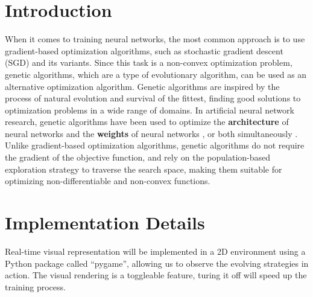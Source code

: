 \documentclass[sigconf]{acmart}
\begin{document}
\section{Introduction}
When it comes to training neural networks, the most common approach is to use gradient-based optimization algorithms, such as stochastic gradient descent (SGD) and its variants. Since this task is a non-convex optimization problem, genetic algorithms, which are a type of evolutionary algorithm, can be used as an alternative optimization algorithm. Genetic algorithms are inspired by the process of natural evolution and survival of the fittest, finding good solutions to optimization problems in a wide range of domains.
In artificial neural network research, genetic algorithms have been used to optimize the \textbf{architecture} of neural networks \cite{wu2021trainingNI} and the \textbf{weights} of neural networks \cite{NN_GA_DavidJ_10.5555/1623755.1623876}, or both simultaneously \cite{stanley2002evolving,NDE_Karl_10.1145/3067695.3075967}. Unlike gradient-based optimization algorithms, genetic algorithms do not require the gradient of the objective function, and rely on the population-based exploration strategy to traverse the search space, making them suitable for optimizing non-differentiable and non-convex functions. 

\section{Implementation Details}
Real-time visual representation will be implemented in a 2D environment using a Python package called ``pygame'', allowing us to observe the evolving strategies in action. The visual rendering is a toggleable feature, turing it off will speed up the training process. 
\end{document}
